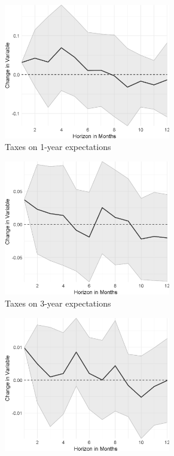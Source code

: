 \newpage
\begin{figure}
	\centering
	\captionsetup{font=footnotesize}
	\begin{subfigure}{00.24\textwidth}
		\includegraphics[width=0.8\textwidth]{output/lp/baseline/bHP/taxes/taxesonexpectations1y_djn.eps}
		\caption{Taxes on 1-year expectations}
	\end{subfigure}
	\begin{subfigure}{00.24\textwidth}
		\includegraphics[width=0.8\textwidth]{output/lp/baseline/bHP/taxes/taxesonexpectations3y_djn.eps}
		\caption{Taxes on 3-year expectations}
	\end{subfigure}
	\begin{subfigure}{00.24\textwidth}
		\includegraphics[width=0.8\textwidth]{output/lp/baseline/bHP/taxes/taxesoninflation_djn.eps}

\end{subfigure}
\end{figure}
